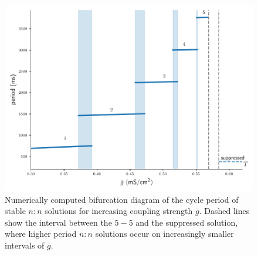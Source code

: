 \documentclass[utf8]{frontiersFPHY} %
\newcommand{\gbar}{\bar g}
\begin{document}
\begin{figure}[h!]
  \centering
  \includegraphics{bif-diagram}
  \caption{Numerically computed bifurcation diagram of the cycle period of stable $n:n$ solutions for increasing coupling strength $\gbar$. Dashed lines show the interval between the $5-5$ and the suppressed solution, where higher period $n:n$ solutions occur on increasingly smaller intervals of $\gbar$.\label{fig:bif-diagram}}
\end{figure}

\end{document}
